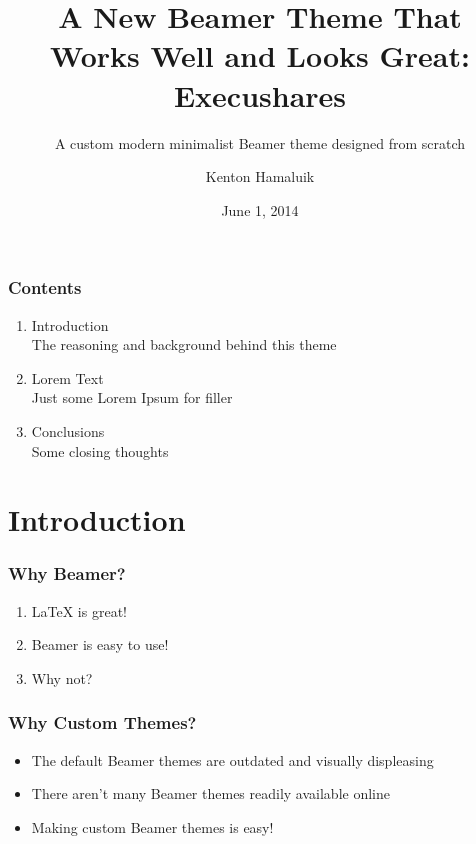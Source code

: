 \documentclass{beamer}
\title{A New Beamer Theme That Works Well and Looks Great: Execushares}
\subtitle{A custom modern minimalist Beamer theme designed from scratch}
\author{Kenton Hamaluik}
\date{June 1, 2014}
\begin{document}
	\setcounter{showProgressBar}{0}
	\setcounter{showSlideNumbers}{0}

	\frame{\titlepage}

	\begin{frame}
		\frametitle{Contents}
		\begin{enumerate}
			\item Introduction \\ \textcolor{ExecusharesGrey}{\footnotesize\hspace{1em} The reasoning and background behind this theme}
			\item Lorem Text  \\ \textcolor{ExecusharesGrey}{\footnotesize\hspace{1em} Just some Lorem Ipsum for filler}
			\item Conclusions \\ \textcolor{ExecusharesGrey}{\footnotesize\hspace{1em} Some closing thoughts}
		\end{enumerate}
	\end{frame}

	\setcounter{framenumber}{0}
	\setcounter{showProgressBar}{1}
	\setcounter{showSlideNumbers}{1}
	\section{Introduction}
		\begin{frame}
			\frametitle{Why Beamer?}
			\begin{enumerate}
				\item LaTeX is great!
				\item Beamer is easy to use!
				\item Why not?
			\end{enumerate}
		\end{frame}

		\begin{frame}
			\frametitle{Why Custom Themes?}
			\begin{itemize}
				\item The default Beamer themes are outdated and visually displeasing
				\item There aren't many Beamer themes readily available online
				\item Making custom Beamer themes is easy!
			\end{itemize}
		\end{frame}
		
\end{document}
